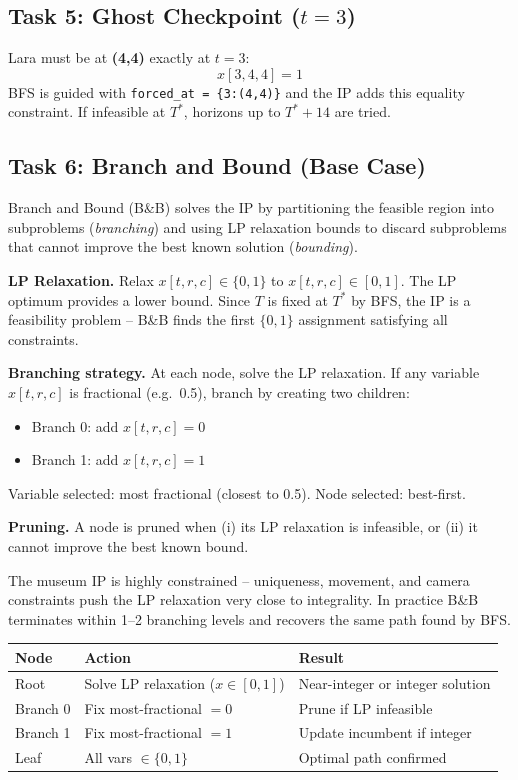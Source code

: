 \documentclass[12pt,a4paper]{article}
\begin{document}
\subsection*{Task 5: Ghost Checkpoint ($t=3$)}

Lara must be at \textbf{(4,4)} exactly at $t=3$:
\[
x[3,4,4]=1
\]
BFS is guided with \texttt{forced\_at = \{3:(4,4)\}} and the IP adds this equality constraint.
If infeasible at $T^*$, horizons up to $T^*+14$ are tried.

\subsection*{Task 6: Branch and Bound (Base Case)}

Branch and Bound (B\&B) solves the IP by partitioning the feasible region into subproblems
(\emph{branching}) and using LP relaxation bounds to discard subproblems that cannot improve
the best known solution (\emph{bounding}).

\textbf{LP Relaxation.}
Relax $x[t,r,c]\in\{0,1\}$ to $x[t,r,c]\in[0,1]$. The LP optimum provides a lower bound.
Since $T$ is fixed at $T^*$ by BFS, the IP is a feasibility problem -- B\&B finds the first
$\{0,1\}$ assignment satisfying all constraints.

\textbf{Branching strategy.}
At each node, solve the LP relaxation. If any variable $x[t,r,c]$ is fractional (e.g.\ 0.5),
branch by creating two children:
\begin{itemize}
  \item Branch 0: add $x[t,r,c]=0$
  \item Branch 1: add $x[t,r,c]=1$
\end{itemize}
Variable selected: most fractional (closest to 0.5). Node selected: best-first.

\textbf{Pruning.}
A node is pruned when (i) its LP relaxation is infeasible, or (ii) it cannot improve the best
known bound.

The museum IP is highly constrained -- uniqueness, movement, and camera constraints push the LP
relaxation very close to integrality. In practice B\&B terminates within 1--2 branching levels
and recovers the same path found by BFS.

\begin{tabular}{lll}
\toprule
Node & Action & Result \\
\midrule
Root     & Solve LP relaxation ($x\in[0,1]$) & Near-integer or integer solution \\
Branch 0 & Fix most-fractional $=0$           & Prune if LP infeasible \\
Branch 1 & Fix most-fractional $=1$           & Update incumbent if integer \\
Leaf     & All vars $\in\{0,1\}$              & Optimal path confirmed \\
\bottomrule
\end{tabular}
\end{document}
